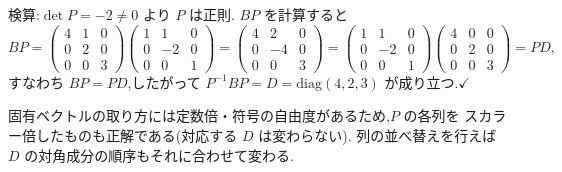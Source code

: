 \documentclass[11pt,a4paper]{article}
\begin{document}
検算:$\det P=-2\neq0$ より $P$ は正則.
$BP$ を計算すると
\[
BP=\begin{pmatrix}4&1&0\\0&2&0\\0&0&3\end{pmatrix}
\begin{pmatrix}1&1&0\\0&-2&0\\0&0&1\end{pmatrix}
=\begin{pmatrix}4&2&0\\0&-4&0\\0&0&3\end{pmatrix}
=\begin{pmatrix}1&1&0\\0&-2&0\\0&0&1\end{pmatrix}
\begin{pmatrix}4&0&0\\0&2&0\\0&0&3\end{pmatrix}=PD,
\]
すなわち $BP=PD$,したがって $P^{-1}BP=D=\mathrm{diag}(4,2,3)$ が成り立つ.$\checkmark$

\vspace{1.5em}
\begin{rem}
固有ベクトルの取り方には定数倍・符号の自由度があるため,$P$ の各列を
スカラー倍したものも正解である(対応する $D$ は変わらない).
列の並べ替えを行えば $D$ の対角成分の順序もそれに合わせて変わる.
\end{rem}
\end{document}
